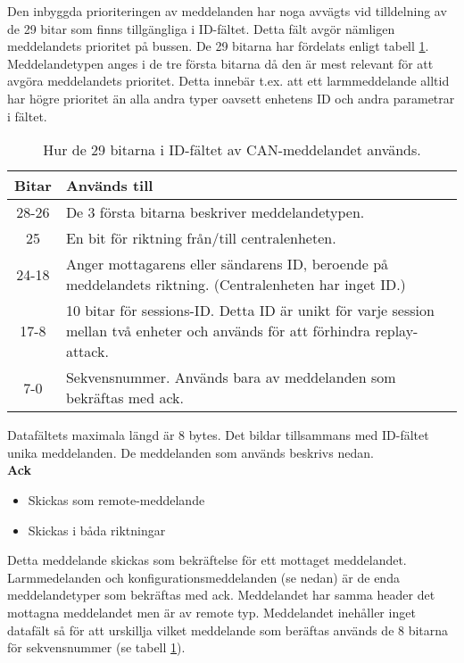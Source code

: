 Den inbyggda prioriteringen av meddelanden har noga avvägts vid tilldelning av de 29 bitar som finns tillgängliga i ID-fältet.
Detta fält avgör nämligen meddelandets prioritet på bussen.
De 29 bitarna har fördelats enligt tabell \ref{tab:idbitar}. Meddelandetypen anges i de tre första bitarna då den är mest relevant för att avgöra meddelandets prioritet. Detta innebär t.ex. att ett larmmeddelande alltid har högre prioritet än alla andra typer oavsett enhetens ID och andra parametrar i fältet.

\begin{table}[H]
	\centering
	\begin{tabular}{|c|p{}|}
		\hline
		Bitar 	& Används till \\ \hline \hline
		28-26		& De 3 första bitarna beskriver meddelandetypen. \\ \hline
		25		& En bit för riktning från/till centralenheten. \\ \hline
		24-18	& Anger mottagarens eller sändarens ID, beroende på meddelandets riktning. (Centralenheten har inget ID.) \\ \hline
		17-8 & 10 bitar för sessions-ID. Detta ID är unikt för varje session mellan två enheter och används för att förhindra replay-attack. \\ \hline
		7-0 & Sekvensnummer. Används bara av meddelanden som bekräftas med ack. \\ \hline

	\end{tabular}
	\caption{Hur de 29 bitarna i ID-fältet av CAN-meddelandet används.}
	\label{tab:idbitar}
\end{table}


Datafältets maximala längd är 8 bytes. Det bildar tillsammans med ID-fältet unika meddelanden. De meddelanden som används beskrivs nedan.\\

\textbf{Ack}
\begin{itemize}
    \item Skickas som remote-meddelande
    \item Skickas i båda riktningar
\end{itemize}
Detta meddelande skickas som bekräftelse för ett mottaget meddelandet. Larmmedelanden och konfigurationsmeddelanden (se nedan) är de enda meddelandetyper som bekräftas med ack. Meddelandet har samma header det mottagna meddelandet men är av remote typ. Meddelandet inehåller inget datafält så för att urskillja vilket meddelande som beräftas används de 8 bitarna för sekvensnummer (se tabell \ref{tab:idbitar}). \\


